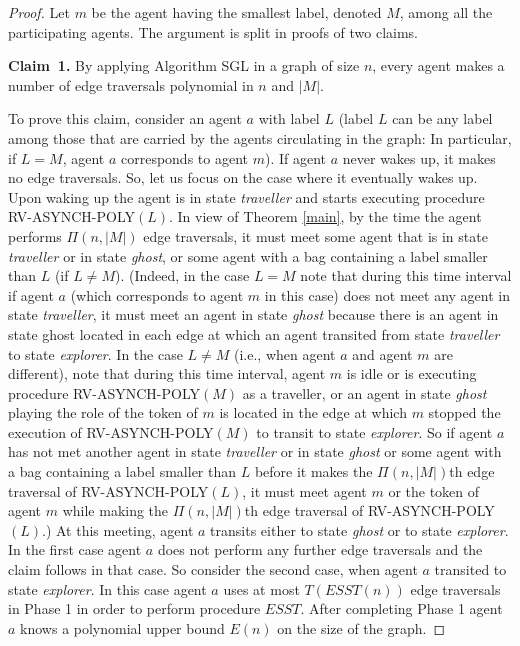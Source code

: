 \documentclass [11pt] {article}
\begin{document}
\begin{proof}
{Let $m$ be the agent having the smallest label, denoted $M$, among all the participating agents. The argument is split in proofs of two claims.}

\vspace*{0.3cm}
\noindent
{{\bf Claim~1.} By applying Algorithm SGL in a graph of size $n$, every agent makes a number of edge traversals polynomial in $n$ and $|M|$.}

{To prove this claim, consider an agent $a$ with label $L$ {(label $L$ can be any label among those that are carried by the agents circulating in the graph: In particular, if $L=M$, agent $a$ corresponds to agent $m$)}. If agent $a$ never wakes up, it makes no edge traversals. So, let us focus on the case where it eventually wakes up. Upon waking up the agent is in state {\em traveller} and starts executing  procedure RV-ASYNCH-POLY$(L)$. In view of Theorem \ref{main},  
by the time the agent performs $\Pi(n,|M|)$ edge traversals, it must meet some agent that is in state {\em traveller} or in state {\em ghost}, or some agent with a bag containing a label smaller than $L$ (if $L\ne M$).} ({Indeed, in the case $L=M$ note that during this time interval if agent $a$ (which corresponds to agent $m$ in this case) does not meet any agent in state {\em traveller}, it must meet an agent in state {\em ghost} because there is an agent in state ghost located in each edge at which an agent transited from state {\em traveller} to state {\em explorer}. In the case $L\ne M$ (i.e., when agent $a$ and agent $m$ are different), note that} during this time interval, agent $m$ is idle or is executing procedure RV-ASYNCH-POLY$(M)$ as a traveller, or an agent in state {\em ghost} playing the role of the token of $m$ is located in the edge at which $m$ stopped the execution of RV-ASYNCH-POLY$(M)$ to transit to state {\em explorer}. So if agent $a$ has not met another agent in state {\em traveller} or in state {\em ghost} or some agent with a bag containing a label smaller than $L$ before it makes the $\Pi(n,|M|)$th edge traversal of RV-ASYNCH-POLY$(L)$, it must meet agent $m$ or the token of agent $m$ while making the $\Pi(n,|M|)$th edge traversal of RV-ASYNCH-POLY$(L)$.) At this meeting, agent $a$ transits either to state
{\em ghost} or to state {\em explorer}. In the first case agent $a$ does not perform any further edge traversals and the claim follows in that case. So consider the second case, when agent $a$ transited to state {\em explorer}.
In this case  agent $a$  uses at most 
{$T(ESST(n))$ edge traversals in Phase 1 in order to perform procedure $ESST$}.
After completing Phase 1 agent $a$ knows a polynomial upper bound $E(n)$ on the size of the graph. 


\end{proof}
\end{document}

